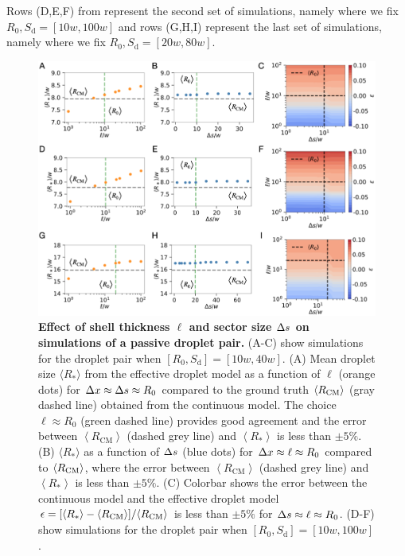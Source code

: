 \begin{appendices}
Rows (D,E,F) from  represent the second set of simulations, namely where we fix $R_0, S_\mathrm{d} = [10w, 100w]$ and rows (G,H,I) represent the last set of simulations, namely where we fix $R_0, S_\mathrm{d} = [20w, 80w]$.
\begin{figure}[tb]
\centering
\includegraphics[scale=0.58]{MainContent/Figures/robustness_test_case.pdf}
\caption{\textbf{Effect of shell thickness $\ell$ and sector size $\Delta s$ on simulations of a passive droplet pair.}
\mbox{(A-C)} show simulations for the droplet pair when $[R_0, S_\mathrm{d}] = [10w, 40w]$.
(A) Mean droplet size $\langle R_\ast \rangle$ from the effective droplet model as a function of $\ell$ (orange dots) for $\Delta x \approx \Delta s \approx R_0$ compared to the ground truth $\langle R_\mathrm{CM}\rangle$ (gray dashed line) obtained from the continuous model.
The choice $\ell \approx R_0$ (green dashed line) provides good agreement and the error between $\left \langle R_\mathrm{CM} \right \rangle$ (dashed grey line) and $\left \langle R_\ast \right \rangle$ is less than $\pm 5\%$.
(B) $\langle R_\ast \rangle$ as a function of $\Delta s$ (blue dots) for $\Delta x \approx \ell \approx R_0$ compared to $\langle R_\mathrm{CM}\rangle$, where the error between $\left \langle R_\mathrm{CM} \right \rangle$ (dashed grey line) and $\left \langle R_\ast \right \rangle$ is less than $\pm 5\%$.
(C) Colorbar shows the error between the continuous model and the effective droplet model $\epsilon = [\langle R_\ast \rangle - \langle R_\mathrm{CM}\rangle] / \langle R_\mathrm{CM}\rangle$ is less than $\pm5\%$ for $\Delta s \approx \ell \approx R_0$.
\mbox{(D-F)} show simulations for the droplet pair when $[R_0, S_\mathrm{d}] = [10w, 100w]$.
}
\end{figure}
\end{appendices}

